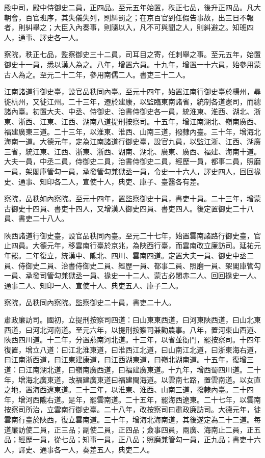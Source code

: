 \begin{pinyinscope}
 殿中司，殿中侍御史二員，正四品。至元五年始置，秩正七品，後升正四品。凡大朝會，百官班序，其失儀失列，則糾罰之；在京百官到任假告事故，出三日不報者，則糾舉之；大臣入內奏事，則隨以入，凡不可與聞之人，則糾避之。知班四人，通事、譯史各一人。



 察院，秩正七品，監察御史三十二員，司耳目之寄，任刺舉之事。至元五年，始置御史十一員，悉以漢人為之。八年，增置六員。十九年，增置一十六員，始參用蒙古人為之。至元二十二年，參用南儒二人。書吏三十二人。



 江南諸道行御史臺，設官品秩同內臺。至元十四年，始置江南行御史臺於楊州，尋徙杭州，又徙江州。二十三年，遷於建康，以監臨東南諸省，統制各道憲司，而總諸內臺。初置大夫、中丞、侍御史、治書侍御史各一員，統淮東、淮西、湖北、浙東、浙西、江東、江西、湖南八道提刑按察司。十五年，增江南湖北、嶺南廣西、福建廣東三道。二十三年，以淮東、淮西、山南三道，撥隸內臺。三十年，增海北海南一道。大德元年，定為江南諸道行御史臺，設官九員，以監江浙、江西、湖廣三省，統江東、江西、浙東、浙西、湖南、湖北、廣東、廣西、福建、海南十道。大夫一員，中丞二員，侍御史二員，治書侍御史二員，經歷一員，都事二員，照磨一員，架閣庫管勾一員，承發管勾兼獄丞一員，令史一十六人，譯史四人，回回掾史、通事、知印各二人，宣使十人，典吏、庫子、臺醫各有差。



 察院，品秩如內察院。至元十四年，置監察御史十員，書吏十員。二十三年，增蒙古御史十四員、書吏十四人，又增漢人御史四員、書吏四人。後定置御史二十八員、書吏二十八人。



 陜西諸道行御史臺，設官品秩同內臺。至元二十七年，始置雲南諸路行御史臺，官止四員。大德元年，移雲南行臺於京兆，為陜西行臺，而雲南改立廉訪司。延祐元年罷。二年復立，統漢中、隴北、四川、雲南四道。定置大夫一員、御史中丞二員、侍御史二員、治書侍御史二員、經歷一員、都事二員、照磨一員、架閣庫管勾一員、承發司管勾兼獄丞一員、掾史一十二人、蒙古必闍赤二人、回回掾史一人、通事二人、知印一人、宣使十人、典吏五人、庫子二人。



 察院，品秩同內察院。監察御史二十員，書吏二十人。



 肅政廉訪司。國初，立提刑按察司四道：曰山東東西道，曰河東陜西道，曰山北東西道，曰河北河南道。至元六年，以提刑按察司兼勸農事。八年，置河東山西道、陜西四川道。十二年，分置燕南河北道。十三年，以省並衙門，罷按察司。十四年復置，增立八道：曰江北淮東道，曰淮西江北道，曰山南江北道，曰浙東海右道，曰江南浙西道，曰江東建康道，曰江西湖東道，曰嶺北湖南道。十五年，復增三道：曰江南湖北道，曰嶺南廣西道，曰福建廣東道。十九年，增西蜀四川道。二十年，增海北廣東道，改福建廣東道曰福建閩海道。以雲南七路，置雲南道。以女直之地，置海西遼東道。二十三年，以淮東、淮西、山南三道，撥隸內臺。二十四年，增河西隴右道。是年，罷雲南道。二十五年，罷海西遼東。二十七年，以雲南按察司所治，立雲南行御史臺。二十八年，改按察司曰肅政廉訪司。大德元年，徙雲南行臺於陜西，復立雲南道。三十年，增海北海南道，其後遂定為二十二道。每道廉訪使二員，正三品；副使二員，正四品；僉事四員，兩廣、海南止二員，正五品；經歷一員，從七品；知事一員，正八品；照磨兼管勾一員，正九品；書吏十六人，譯史、通事各一人，奏差五人，典吏二人。




\end{pinyinscope}

